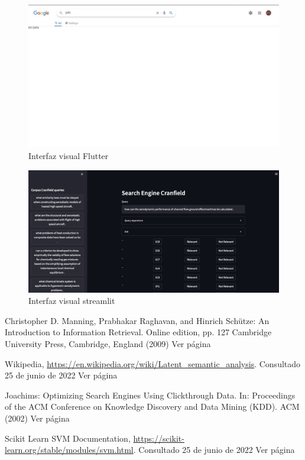 \documentclass[runningheads]{llncs}
\begin{document}
\begin{figure}
\includegraphics[width=\textwidth]{ui.jpg}
\caption{Interfaz visual Flutter} \label{ui_fig}
\end{figure}
    
\begin{figure}
    \includegraphics[width=\textwidth]{ui_streamlit.png}
    \caption{Interfaz visual streamlit} \label{ui_streamlit_fig}
\end{figure}

\newpage
        
\begin{thebibliography}{8}

Christopher D. Manning, Prabhakar Raghavan, and Hinrich Schütze:
An Introduction to Information Retrieval. Online edition, pp. 127 Cambridge University Press,
Cambridge, England (2009) Ver página

Wikipedia, \url{https://en.wikipedia.org/wiki/Latent\_semantic\_analysis}. Consultado 25 de junio de 2022 Ver página

Joachims: Optimizing Search Engines Using Clickthrough Data. In: Proceedings of the ACM Conference 
on Knowledge Discovery and Data Mining (KDD). ACM (2002) Ver página

Scikit Learn SVM Documentation, \url{https://scikit-learn.org/stable/modules/svm.html}. Consultado 25 de junio de 2022 Ver página 

\end{thebibliography}
\end{document}
